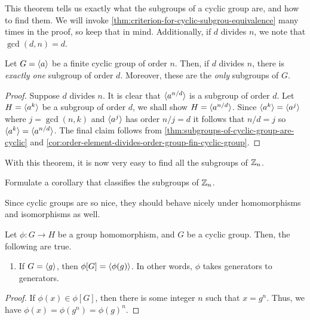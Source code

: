 \documentclass[./main.tex]{subfiles}
\begin{document}
This theorem tells us exactly what the subgroups of a cyclic group are, and how
to find them. We will invoke \cref{thm:criterion-for-cyclic-subgrou-equivalence}
many times in the proof, so keep that in mind. Additionally, if $d$ divides $n$,
we note that $\gcd(d,n) = d$.
\begin{theorem}
    Let $G = { \langle a \rangle }$ be a finite cyclic group of order $n$. Then, if $d$
    divides $n$, there is \emph{exactly one} subgroup of order $d$. Moreover,
    these are the \emph{only} subgroups of $G$.
\end{theorem}
\begin{proof}
    Suppose $d$ divides $n$. It is clear that ${ \langle a^{n/d} \rangle }$ is a subgroup of
    order $d$. Let $H = { \langle a^k \rangle }$ be a subgroup of order $d$, we shall show $H
    = { \langle a^{n/d} \rangle }$. Since ${ \langle a^k \rangle } = { \langle a^j \rangle }$ where $j = \gcd(n, k)$ and
    ${ \langle a^j \rangle }$ has order $n/j = d$ it follows that $n/d=j$ so ${ \langle a^k \rangle } =
    { \langle a^{n/d} \rangle }$. The final claim follows from
    \cref{thm:subgroups-of-cyclic-group-are-cyclic} and
    \cref{cor:order-element-divides-order-group-fin-cyclic-group}.
\end{proof}

With this theorem, it is now very easy to find all the subgroups of $\mathbb{Z}_n$.
\begin{exercise}
    Formulate a corollary that classifies the subgroups of $\mathbb{Z}_n$.
\end{exercise}

Since cyclic groups are so nice, they should behave nicely under homomorphisms
and isomorphisms as well. 
\begin{proposition}
\label{prop:cyclic-group-properties-homomorphisms}
    Let $\phi: G \to H$ be a group homomorphism, and $G$ be a cyclic group.
    Then, the following are true. 
    \begin{enumerate}
        \item If $G = { \langle g \rangle }$, then $\phi[G] = { \langle \phi(g) \rangle }$. In other words,
        $\phi$ takes generators to generators.
    \end{enumerate}
\end{proposition}

\begin{proof}
    If $\phi(x) \in \phi[G]$, then there is some integer $n$ such that $x =
    g^n$. Thus, we have $\phi(x) = \phi(g^n) = \phi(g)^n$. 
\end{proof}
\end{document}
